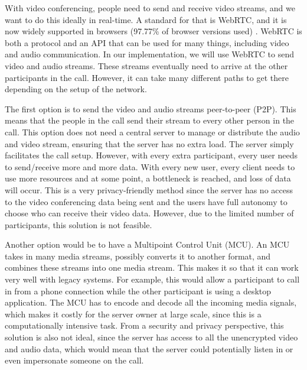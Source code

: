 \documentclass{report}
\begin{document}
With video conferencing, people need to send and receive video streams, and we want to do this ideally in real-time.
A standard for that is WebRTC, and it is now widely supported in browsers (97.77\% of browser versions used) \cite{
noauthor_webrtc_nodate}. WebRTC is both a protocol and an API that can be used for many things, including video and audio communication. In our
implementation, we will use WebRTC to send video and audio streams. These streams eventually need to arrive at
the other participants in the call. However, it can take many different paths to get there depending on the setup of
the network.

The first option is to send the video and audio streams peer-to-peer (P2P). This means that the people in
the call send their stream to every other person in the call. This option does not need a central server to manage or
distribute the audio and video stream, ensuring that the server has no extra load. The server simply
facilitates the call setup. However, with every extra participant, every user needs to send/receive more and more
data. With every new user, every client needs to use more resources and at some point, a bottleneck is
reached, and loss of data will occur. This is a very privacy-friendly method since the server has no access to the
video conferencing data being sent and the users have full autonomy to choose who can receive their video data.
However, due to the limited number of participants, this solution is not feasible.

Another option would be to have a Multipoint Control Unit (MCU). An MCU takes in many media streams, possibly
converts it to another format, and combines these streams into one media stream. This makes it so that it can work
very well with legacy systems. For example, this would allow a participant to call in from a phone
connection while the other participant is using a desktop application. The MCU has to encode and decode all the
incoming media signals, which makes it costly for the server owner at large scale, since this is a computationally intensive
task. From a security and privacy perspective, this solution is also not ideal, since the server has access to all the
unencrypted video and audio data, which would mean that the server could potentially listen in or even impersonate
someone on the call.
\end{document}
